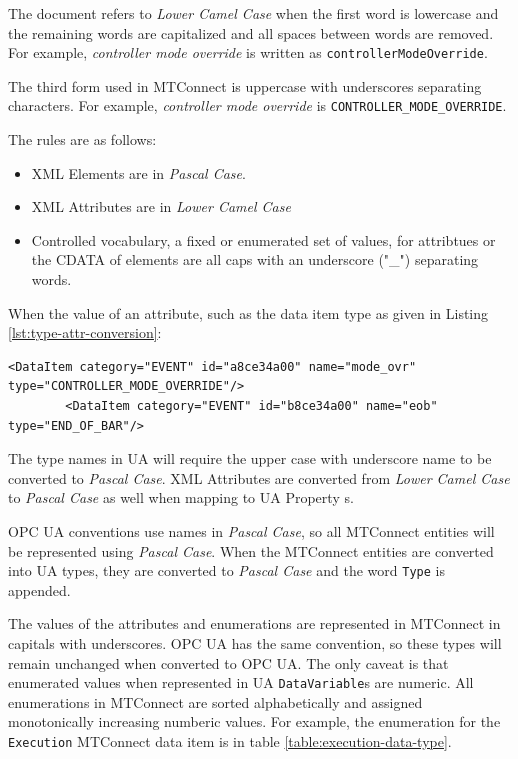 The document refers to \textit{Lower Camel Case} when the first word is lowercase and the remaining words are capitalized and all spaces between words are removed. For example, \textit{controller mode override} is written as \texttt{controllerModeOverride}.

The third form used in MTConnect is uppercase with underscores separating characters. For example, \textit{controller mode override} is \texttt{CONTROLLER_MODE_OVERRIDE}.

The rules are as follows:
\begin{itemize}
  \item XML Elements are in \textit{Pascal Case}.
  \item XML Attributes are in \textit{Lower Camel Case}
  \item Controlled vocabulary, a fixed or enumerated set of values, for attribtues or the CDATA of elements are all caps with an underscore ("\_") separating words. 
\end{itemize}

When the value of an attribute, such as the data item type as given in Listing \ref{lst:type-attr-conversion}:

\begin{lstlisting}[firstnumber=1,%
    caption={\texttt{DataItem} \texttt{type} Attribtue Conversion}, label={lst:type-attr-conversion}]
        <DataItem category="EVENT" id="a8ce34a00" name="mode_ovr" type="CONTROLLER_MODE_OVERRIDE"/>
        <DataItem category="EVENT" id="b8ce34a00" name="eob" type="END_OF_BAR"/>
\end{lstlisting}

The type names in UA will require the upper case with underscore name to be converted to \textit{Pascal Case}. XML Attributes are converted from \textit{Lower Camel Case} to \textit{Pascal Case} as well when mapping to UA Property s.

OPC UA conventions use names in \textit{Pascal Case}, so all MTConnect entities will be represented using \textit{Pascal Case}. When the MTConnect entities are converted into UA types, they are converted to \textit{Pascal Case} and the word \texttt{Type} is appended. 

The values of the attributes and enumerations are represented in MTConnect in capitals with underscores. OPC UA has the same convention, so these types will remain unchanged when converted to OPC UA. The only caveat is that enumerated values when represented in UA \texttt{DataVariable}s are numeric. All enumerations in MTConnect are sorted alphabetically and assigned monotonically increasing numberic values. For example, the enumeration for the \texttt{Execution} MTConnect data item is in table \ref{table:execution-data-type}.

